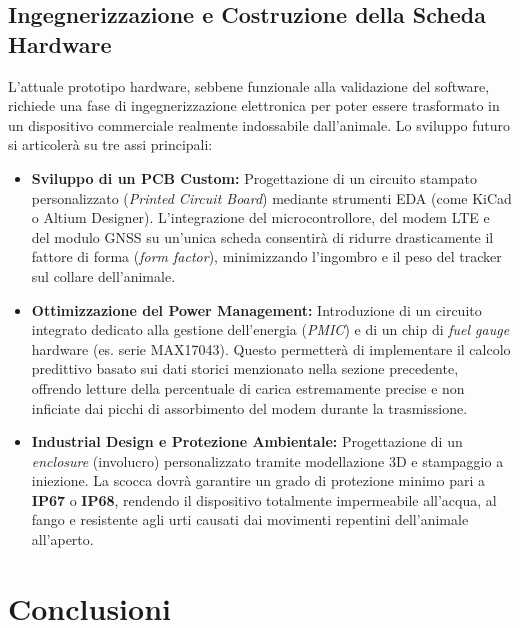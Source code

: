 \documentclass[12pt,a4paper]{article}
\begin{document}
\subsection{Ingegnerizzazione e Costruzione della Scheda Hardware}
L'attuale prototipo hardware, sebbene funzionale alla validazione del software, richiede una fase di ingegnerizzazione elettronica per poter essere trasformato in un dispositivo commerciale realmente indossabile dall'animale. Lo sviluppo futuro si articolerà su tre assi principali:
\begin{itemize}
    \item \textbf{Sviluppo di un PCB Custom:} Progettazione di un circuito stampato personalizzato (\textit{Printed Circuit Board}) mediante strumenti EDA (come KiCad o Altium Designer). L'integrazione del microcontrollore, del modem LTE e del modulo GNSS su un'unica scheda consentirà di ridurre drasticamente il fattore di forma (\textit{form factor}), minimizzando l'ingombro e il peso del tracker sul collare dell'animale.
    \item \textbf{Ottimizzazione del Power Management:} Introduzione di un circuito integrato dedicato alla gestione dell'energia (\textit{PMIC}) e di un chip di \textit{fuel gauge} hardware (es. serie MAX17043). Questo permetterà di implementare il calcolo predittivo basato sui dati storici menzionato nella sezione precedente, offrendo letture della percentuale di carica estremamente precise e non inficiate dai picchi di assorbimento del modem durante la trasmissione.
    \item \textbf{Industrial Design e Protezione Ambientale:} Progettazione di un \textit{enclosure} (involucro) personalizzato tramite modellazione 3D e stampaggio a iniezione. La scocca dovrà garantire un grado di protezione minimo pari a \textbf{IP67} o \textbf{IP68}, rendendo il dispositivo totalmente impermeabile all'acqua, al fango e resistente agli urti causati dai movimenti repentini dell'animale all'aperto.
\end{itemize}

\section{Conclusioni}

\newpage

\printbibliography[title={Riferimenti bibliografici}]
\end{document}
